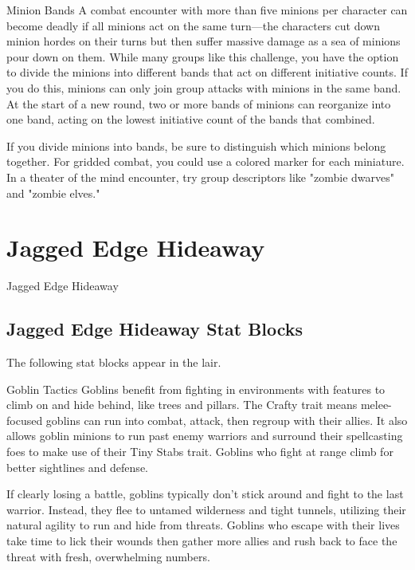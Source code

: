 \documentclass[10pt,a4paper,twoside,bg=print,twocolumn,openany,nodeprecatedcode]{dndbook}
\begin{document}
\begin{DndSidebar}[float=!b]{Minion Bands}
A combat encounter with more than five minions per character can become deadly if all minions act on the same turn—the characters cut down minion hordes on their turns but then suffer massive damage as a sea of minions pour down on them. While many groups like this challenge, you have the option to divide the minions into different bands that act on different initiative counts. If you do this, minions can only join group attacks with minions in the same band. At the start of a new round, two or more bands of minions can reorganize into one band, acting on the lowest initiative count of the bands that combined.



If you divide minions into bands, be sure to distinguish which minions belong together. For gridded combat, you could use a colored marker for each miniature. In a theater of the mind encounter, try group descriptors like "zombie dwarves" and "zombie elves."



\end{DndSidebar}

\chapter{Jagged Edge Hideaway}
Jagged Edge Hideaway

\section{Jagged Edge Hideaway Stat Blocks}
The following stat blocks appear in the lair.

\begin{DndSidebar}[float=!b]{Goblin Tactics}
Goblins benefit from fighting in environments with features to climb on and hide behind, like trees and pillars. The Crafty trait means melee-focused goblins can run into combat, attack, then regroup with their allies. It also allows goblin minions to run past enemy warriors and surround their spellcasting foes to make use of their Tiny Stabs trait. Goblins who fight at range climb for better sightlines and defense.



If clearly losing a battle, goblins typically don't stick around and fight to the last warrior. Instead, they flee to untamed wilderness and tight tunnels, utilizing their natural agility to run and hide from threats. Goblins who escape with their lives take time to lick their wounds then gather more allies and rush back to face the threat with fresh, overwhelming numbers.



\end{DndSidebar}
\end{document}
